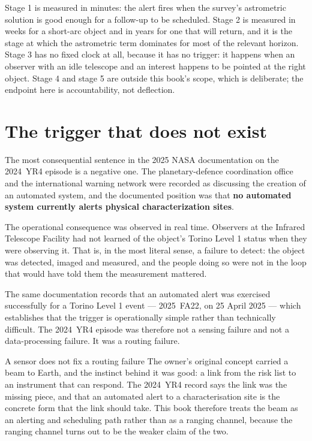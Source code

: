 Stage 1 is measured in minutes: the alert fires when the survey's astrometric
solution is good enough for a follow-up to be scheduled. Stage 2 is measured
in weeks for a short-arc object and in years for one that will return, and it
is the stage at which the astrometric term dominates for most of the
relevant horizon. Stage 3 has no fixed clock at all, because it has no
trigger: it happens when an observer with an idle telescope and an interest
happens to be pointed at the right object. Stage 4 and stage 5 are outside
this book's scope, which is deliberate; the endpoint here is accountability,
not deflection.

\section{The trigger that does not exist}

The most consequential sentence in the 2025 NASA documentation on the
2024~YR4 episode is a negative one. The planetary-defence coordination
office and the international warning network were recorded as discussing the
creation of an automated system, and the documented position was that
\textbf{no automated system currently alerts physical characterization
sites}.

The operational consequence was observed in real time. Observers at the
Infrared Telescope Facility had not learned of the object's Torino Level 1
status when they were observing it. That is, in the most literal sense, a
failure to detect: the object was detected, imaged and measured, and the
people doing so were not in the loop that would have told them the
measurement mattered.

The same documentation records that an automated alert was exercised
successfully for a Torino Level 1 event --- 2025~FA22, on 25 April 2025 ---
which establishes that the trigger is operationally simple rather than
technically difficult. The 2024~YR4 episode was therefore not a sensing
failure and not a data-processing failure. It was a routing failure.

\begin{seamnote}{A sensor does not fix a routing failure}
The owner's original concept carried a beam to Earth, and the instinct behind
it was good: a link from the risk list to an instrument that can respond. The
2024~YR4 record says the link was the missing piece, and that an automated
alert to a characterisation site is the concrete form that the link should
take. This book therefore treats the beam as an alerting and scheduling path
rather than as a ranging channel, because the ranging channel turns out to be
the weaker claim of the two.
\end{seamnote}

